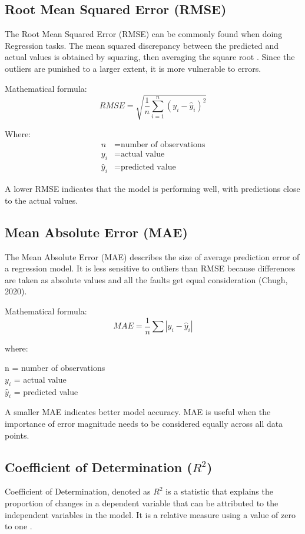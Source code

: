 \documentclass[12pt, a4paper, oneside]{book}
\begin{document}
\subsection{Root Mean Squared Error (RMSE)}

The Root Mean Squared Error (RMSE) can be commonly found when doing Regression tasks. The mean squared discrepancy between the predicted and actual values is obtained by squaring, then averaging the square root \cite{chugh2020}. Since the outliers are punished to a larger extent, it is more vulnerable to errors.

Mathematical formula:
\[
RMSE = \sqrt{\frac{1}{n} \sum_{i=1}^{n} (y_i - \hat{y}_i)^2}
\]

Where:
\begin{align*}
n &= \text{number of observations} \\
y_i &= \text{actual value} \\
\hat{y}_i &= \text{predicted value}
\end{align*}

A lower RMSE indicates that the model is performing well, with predictions close to the actual values.

\subsection{Mean Absolute Error (MAE)}

The Mean Absolute Error (MAE) describes the size of average prediction error of a regression model. It is less sensitive to outliers than RMSE because differences are taken as absolute values and all the faults get equal consideration (Chugh, 2020).

Mathematical formula:
\[
MAE = \frac{1}{n} \sum |y_i - \hat{y}_i|
\]

where:

n = number of observations\\
$y_i$ = actual value\\
$\hat{y}_i$ = predicted value

A smaller MAE indicates better model accuracy. MAE is useful when the importance of error magnitude needs to be considered equally across all data points.

\subsection{Coefficient of Determination ($R^2$)}

Coefficient of Determination, denoted as $R^2$ is a statistic that explains the proportion of changes in a dependent variable that can be attributed to the independent variables in the model. It is a relative measure using a value of zero to one \cite{chugh2020}.
\end{document}
